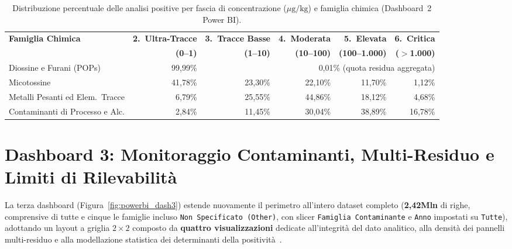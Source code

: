 \begin{table}[htbp]
\centering
\caption{Distribuzione percentuale delle analisi positive per fascia di concentrazione ($\mu\text{g/kg}$) e famiglia chimica (Dashboard~2 Power BI).}
\label{tab:powerbi_conc_profile}
\small
\setlength{\tabcolsep}{4pt}
\begin{tabularx}{\textwidth}{@{}>{\raggedright\arraybackslash}Xrrrrr@{}}
\toprule
\textbf{Famiglia Chimica} & \textbf{2.\ Ultra-Tracce} & \textbf{3.\ Tracce Basse} & \textbf{4.\ Moderata} & \textbf{5.\ Elevata} & \textbf{6.\ Critica} \\
 & \textbf{(0--1)} & \textbf{(1--10)} & \textbf{(10--100)} & \textbf{(100--1.000)} & \textbf{($>$1.000)} \\
\midrule
Diossine e Furani (POPs) & 99,99\% & \multicolumn{4}{r}{0,01\% (quota residua aggregata)} \\
Micotossine & 41,78\% & 23,30\% & 22,10\% & 11,70\% & 1,12\% \\
Metalli Pesanti ed Elem.\ Tracce & 6,79\% & 25,55\% & 44,86\% & 18,12\% & 4,68\% \\
Contaminanti di Processo e Alc. & 2,84\% & 11,45\% & 30,04\% & 38,89\% & 16,78\% \\
\bottomrule
\end{tabularx}
\end{table}

\section{Dashboard 3: Monitoraggio Contaminanti, Multi-Residuo e Limiti di Rilevabilità}
\label{sec:powerbi_dash3}

La terza dashboard (Figura~\ref{fig:powerbi_dash3}) estende nuovamente il perimetro all'intero dataset completo (\textbf{2,42Mln} di righe, comprensive di tutte e cinque le famiglie incluso \texttt{Non Specificato (Other)}, con slicer \texttt{Famiglia Contaminante} e \texttt{Anno} impostati su \texttt{Tutte}), adottando un layout a griglia $2 \times 2$ composto da \textbf{quattro visualizzazioni} dedicate all'integrità del dato analitico, alla densità dei pannelli multi-residuo e alla modellazione statistica dei determinanti della positività~\citep{sharda2020}.


